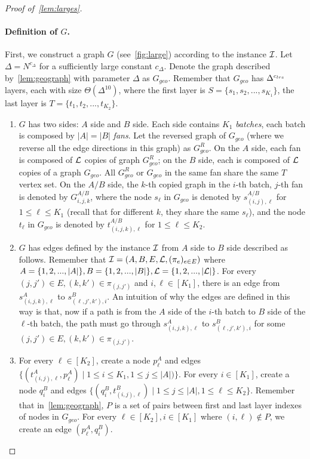\begin{proof}[Proof of~\cref{lem:larges}]
	\paragraph{Definition of $G$.} First, we construct a graph $G$ (see~\cref{fig:large}) according to the instance $\mathcal{I}$. Let $\Delta=N^{c_{\Delta}}$ for a sufficiently large constant $c_{\Delta}$. Denote the graph described by~\cref{lem:geograph} with parameter $\Delta$ as $G_{geo}$. Remember that $G_{geo}$ has $\Delta^{{c_{lrs}}{}}$ layers, each with size $\Theta(\Delta^{10})$, where the first layer is $S=\{s_1,s_2,...,s_{K_1}\}$, the last layer is $T=\{t_1,t_2,...,t_{K_2}\}$.
	\begin{enumerate}
		\item $G$ has two sides: $A$ side and $B$ side. Each side contains $K_1$ \emph{batches}, each batch is composed by $|A|=|B|$ \emph{fans}. Let the reversed graph of $G_{geo}$ (where we reverse all the edge directions in this graph) as $G^R_{geo}$. On the $A$ side, each fan is composed of $\mathcal{L}$ copies of graph $G^R_{geo}$; on the $B$ side, each is composed of $\mathcal{L}$ copies of a graph $G_{geo}$. All $G^R_{geo}$ or $G_{geo}$ in the same fan share the same $T$ vertex set. On the $A/B$ side, the $k$-th copied graph in the $i$-th batch, $j$-th fan is denoted by $G^{A/B}_{i,j,k}$, where the node $s_\ell$ in $G_{geo}$ is denoted by $s^{A/B}_{(i,j),\ell}$ for $1\le \ell\le K_1$ (recall that for different $k$, they share the same $s_\ell$), and the node $t_\ell$ in $G_{geo}$ is denoted by $t^{A/B}_{(i,j,k),\ell}$ for $1\le \ell\le K_2$. 
		\item $G$ has edges defined by the \labcov{} instance $\mathcal{I}$ from $A$ side to $B$ side described as follows. Remember that $\mathcal{I}=(A,B,E,\mathcal{L},(\pi_e)_{e\in E})$ where $A=\{1,2,...,|A|\},B=\{1,2,...,|B|\},\mathcal{L}=\{1,2,...,|\mathcal{L}|\}$. For every $(j,j')\in E,(k,k')\in\pi_{(j,j')}$ and $i,\ell\in[K_1]$, there is an edge from $s^A_{(i,j,k),\ell}$ to $s^B_{(\ell,j',k'),i}$. 
		An intuition of why the edges are defined in this way is that, now if a path is from the $A$ side of the $i$-th batch to $B$ side of the $\ell$-th batch, the path must go through $s^A_{(i,j,k),\ell}$ to $s^B_{(\ell,j',k'),i}$ for some $(j,j')\in E,(k,k')\in\pi_{(j,j')}$.
		\item For every $\ell\in[K_2]$, create a node $p^A_\ell$ and edges $\{(t^A_{(i,j),\ell},p^A_\ell)\mid 1\le i\le K_1,1\le j\le |A|)\}$. For every $i\in[K_1]$, create a node $q^B_i$ and edges $\{(q^B_i,t^B_{(i,j),\ell})\mid 1\le j\le |A|,1\le \ell\le K_2\}$. Remember that in~\cref{lem:geograph}, $P$ is a set of pairs between first and last layer indexes of nodes in $G_{geo}$. For every $\ell\in[K_2],i\in[K_1]$ where $(i,\ell)\not\in P$, we create an edge $(p^A_{\ell},q^B_{i})$. 
		

\end{enumerate}
\end{proof}
